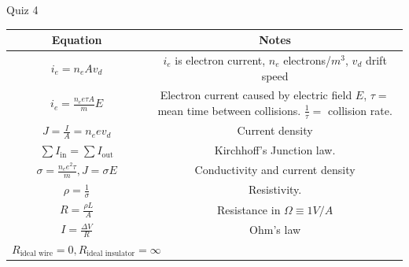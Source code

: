 \documentclass{article}
\begin{document}
\begin{section}{Quiz 4}
 \begin{tabular}{|c|c|}
	 \hline
	 Equation                                                                               & Notes                                                               \\
	 \hline
	 $i_e = n_e A v_d$                                                                      & $i_e$ is electron current, $n_e$ electrons/$m^3$, $v_d$ drift speed \\

	 $i_e = \frac{n_e e \tau A}{m} E$                                                       & \makecell{Electron current caused by electric field $E$,            \\ $\tau=$ mean time between collisions. $\frac{1}{\tau}=$ collision rate.} \\

	 $J = \frac{I}{A} = n_e e v_d$                                                          & Current density                                                     \\

	 $\sum I_\text{in} = \sum I_\text{out}$                                                 & Kirchhoff's Junction law.                                           \\

	 $\sigma = \frac{n_e e^2 \tau}{m}, J = \sigma E$                                        & Conductivity and current density                                    \\

	 $\rho = \frac{1}{\sigma}$                                                              & Resistivity.                                                        \\


	 $R = \frac{\rho L}{A}$                                                                 & Resistance in $\Omega \equiv 1 V/A$                                 \\

	 $I = \frac{\Delta V}{R}$                                                               & Ohm's law                                                           \\

	 $R_\text{ideal wire} = 0, R_\text{ideal insulator} = \infty$                           &                                                                     \\


\end{tabular}
\end{section}
\end{document}
